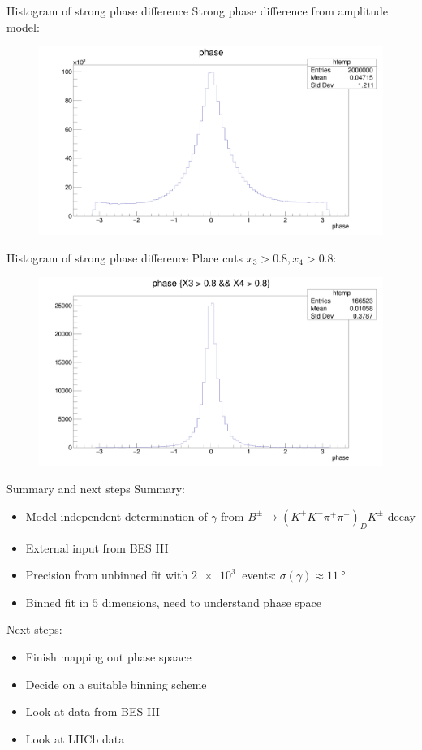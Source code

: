 \documentclass{beamer}
\begin{document}
\begin{frame}{Histogram of strong phase difference}
  Strong phase difference from amplitude model:
  \begin{figure}
    \includegraphics[width = 1\textwidth]{strongphase.png}
  \end{figure}
\end{frame}

\begin{frame}{Histogram of strong phase difference}
  Place cuts $x_3 > 0.8, x_4 > 0.8$:
  \begin{figure}
    \includegraphics[width = 1\textwidth]{strongphasecut.png}
  \end{figure}
\end{frame}

\begin{frame}{Summary and next steps}
  Summary:
  \begin{itemize}
    \item{Model independent determination of $\gamma$ from $B^\pm\to(K^+K^-\pi^+\pi^-)_DK^\pm$ decay}
    \item{External input from BES III}
    \item{Precision from unbinned fit with $\SI{2e3}{}$ events: $\sigma(\gamma)\approx\SI{11}{\degree}$}
    \item{Binned fit in $5$ dimensions, need to understand phase space}
  \end{itemize}
  Next steps:
  \begin{itemize}
    \item{Finish mapping out phase spaace}
    \item{Decide on a suitable binning scheme}
    \item{Look at data from BES III}
    \item{Look at LHCb data}
  \end{itemize}
\end{frame}
\end{document}
